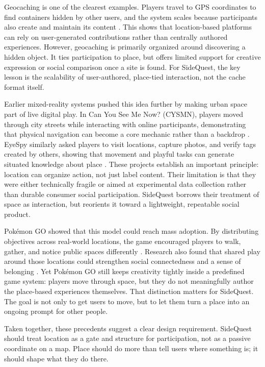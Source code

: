 \documentclass[12pt,a4paper,oneside]{report}
\begin{document}
Geocaching is one of the clearest examples. Players travel to GPS coordinates to find containers hidden by other users, and the system scales because participants also create and maintain its content \cite{Geocaching}. This shows that location-based platforms can rely on user-generated contributions rather than centrally authored experiences. However, geocaching is primarily organized around discovering a hidden object. It ties participation to place, but offers limited support for creative expression or social comparison once a site is found. For SideQuest, the key lesson is the scalability of user-authored, place-tied interaction, not the cache format itself.

Earlier mixed-reality systems pushed this idea further by making urban space part of live digital play. In Can You See Me Now? (CYSMN), players moved through city streets while interacting with online participants, demonstrating that physical navigation can become a core mechanic rather than a backdrop \cite{CYSMN}. EyeSpy similarly asked players to visit locations, capture photos, and verify tags created by others, showing that movement and playful tasks can generate situated knowledge about place \cite{Eyespy}. These projects establish an important principle: location can organize action, not just label content. Their limitation is that they were either technically fragile or aimed at experimental data collection rather than durable consumer social participation. SideQuest borrows their treatment of space as interaction, but reorients it toward a lightweight, repeatable social product.

Pokémon GO showed that this model could reach mass adoption. By distributing objectives across real-world locations, the game encouraged players to walk, gather, and notice public spaces differently \cite{Pokemon}. Research also found that shared play around those locations could strengthen social connectedness and a sense of belonging \cite{PokemonBelong}. Yet Pokémon GO still keeps creativity tightly inside a predefined game system: players move through space, but they do not meaningfully author the place-based experiences themselves. That distinction matters for SideQuest. The goal is not only to get users to move, but to let them turn a place into an ongoing prompt for other people.

Taken together, these precedents suggest a clear design requirement. SideQuest should treat location as a gate and structure for participation, not as a passive coordinate on a map. Place should do more than tell users where something is; it should shape what they do there.
\end{document}
